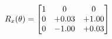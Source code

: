 \documentclass[preview]{standalone}
\begin{document}
\begin{align*}
\special{dvisvgm:raw <g id='unique000'>}R_{x}(\theta) = \begin{bmatrix}1 & 0 & 0 \\0 & +0.03 & +1.00 \\0 & -1.00 & +0.03\end{bmatrix}\special{dvisvgm:raw </g>}
\end{align*}
\end{document}
